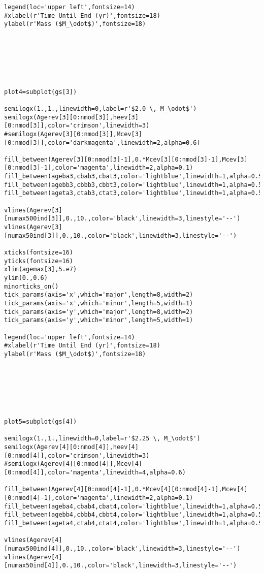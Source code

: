 \begin{verbatim}
legend(loc='upper left',fontsize=14)
#xlabel(r'Time Until End (yr)',fontsize=18)
ylabel(r'Mass ($M_\odot$)',fontsize=18)







plot4=subplot(gs[3])

semilogx(1.,1.,linewidth=0,label=r'$2.0 \, M_\odot$')
semilogx(Agerev[3][0:nmod[3]],heev[3][0:nmod[3]],color='crimson',linewidth=3)
#semilogx(Agerev[3][0:nmod[3]],Mcev[3][0:nmod[3]],color='darkmagenta',linewidth=2,alpha=0.6)

fill_between(Agerev[3][0:nmod[3]-1],0.*Mcev[3][0:nmod[3]-1],Mcev[3][0:nmod[3]-1],color='magenta',linewidth=2,alpha=0.1)
fill_between(ageba3,cbab3,cbat3,color='lightblue',linewidth=1,alpha=0.5)
fill_between(agebb3,cbbb3,cbbt3,color='lightblue',linewidth=1,alpha=0.5)
fill_between(ageta3,ctab3,ctat3,color='lightblue',linewidth=1,alpha=0.5)

vlines(Agerev[3][numax500ind[3]],0.,10.,color='black',linewidth=3,linestyle='--')
vlines(Agerev[3][numax50ind[3]],0.,10.,color='black',linewidth=3,linestyle='--')

xticks(fontsize=16)
yticks(fontsize=16)
xlim(agemax[3],5.e7)
ylim(0.,0.6)
minorticks_on()
tick_params(axis='x',which='major',length=8,width=2)
tick_params(axis='x',which='minor',length=5,width=1)
tick_params(axis='y',which='major',length=8,width=2)
tick_params(axis='y',which='minor',length=5,width=1)

legend(loc='upper left',fontsize=14)
#xlabel(r'Time Until End (yr)',fontsize=18)
ylabel(r'Mass ($M_\odot$)',fontsize=18)







plot5=subplot(gs[4])

semilogx(1.,1.,linewidth=0,label=r'$2.25 \, M_\odot$')
semilogx(Agerev[4][0:nmod[4]],heev[4][0:nmod[4]],color='crimson',linewidth=3)
#semilogx(Agerev[4][0:nmod[4]],Mcev[4][0:nmod[4]],color='magenta',linewidth=4,alpha=0.6)

fill_between(Agerev[4][0:nmod[4]-1],0.*Mcev[4][0:nmod[4]-1],Mcev[4][0:nmod[4]-1],color='magenta',linewidth=2,alpha=0.1)
fill_between(ageba4,cbab4,cbat4,color='lightblue',linewidth=1,alpha=0.5)
fill_between(agebb4,cbbb4,cbbt4,color='lightblue',linewidth=1,alpha=0.5)
fill_between(ageta4,ctab4,ctat4,color='lightblue',linewidth=1,alpha=0.5)

vlines(Agerev[4][numax500ind[4]],0.,10.,color='black',linewidth=3,linestyle='--')
vlines(Agerev[4][numax50ind[4]],0.,10.,color='black',linewidth=3,linestyle='--')


\end{verbatim}
